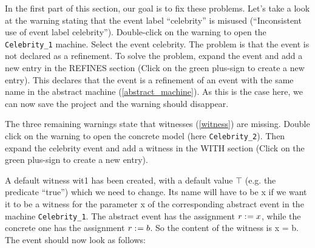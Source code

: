 In the first part of this section, our goal is to fix these problems. Let's take a look at the warning stating that the event label ``celebrity'' is misused (``Inconsistent use of event label celebrity''). Double-click on the warning to open the \texttt{Celebrity\_1} machine. Select the event \textsf{celebrity}. The problem is that the event is not declared as a refinement. To solve the problem, expand the event and add a new entry in the \textsf{REFINES} section (Click on the green plus-sign to create a new entry). This declares that the event is a refinement of an event with the same name in the abstract machine (\ref{abstract_machine}). As this is the case here, we can now save the project and the warning should disappear.


The three remaining warnings state that witnesses (\ref{witness}) are missing. Double click on the warning to open the concrete model (here \texttt{Celebrity\_2}). Then expand the \textsf{celebrity} event and add a witness in the \textsf{WITH} section (Click on the green plus-sign to create a new entry).

A default witness \textsf{wit1} has been created, with a default value \textsf{$\top$} (e.g. the predicate ``true'') which we need to change. Its name will have to be \textsf{x} if we want it to be a witness for the parameter \textsf{x} of the corresponding abstract event in the machine \texttt{Celebrity\_1}. The abstract event has the assignment \textsf{$r \mathrel{:\mkern1mu=} x$}, while the concrete one has the assignment \textsf{$r \mathrel{:\mkern1mu=} b$}. So the content of the witness is \textsf{x = b}. The event should now look as follows: 

\begin{description}
		\begin{description}
		\WhenGrd
			\begin{description}
			\end{description}
		\Witnesses
			\begin{description}
			\nItem{ x }{ x=b }
			\end{description}
		\ThenAct
			\begin{description}
			\nItemX{ act1 }{ r :=  b }
			\end{description}
		\EndAct
		\end{description}
\end{description}

